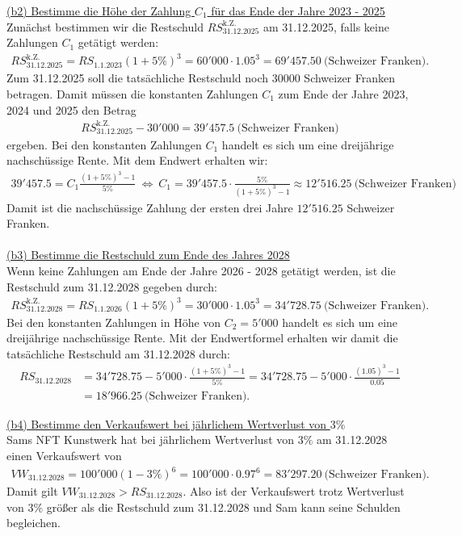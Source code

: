 \underline{(b2) Bestimme die Höhe der Zahlung $C_1$ für das Ende der Jahre 2023 - 2025}\\
Zunächst bestimmen wir die Restschuld $RS_{\mathrm{31.12.2025}}^{\mathrm{k.Z.}}$ am 31.12.2025, falls keine Zahlungen $C_1$ getätigt werden:
\begin{align*}
RS_{\mathrm{31.12.2025}}^{\mathrm{k.Z.}}
	=
	RS_{\mathrm{1.1.2023}}
	(1+ 5\% )^3
	=
	60'000 \cdot  1.05^3 
	=
	69'457.50 \ \textrm{(Schweizer Franken)}.
\end{align*}
Zum 31.12.2025 soll die tatsächliche Restschuld noch $30000$ Schweizer Franken betragen. Damit müssen die konstanten Zahlungen $C_1$ zum Ende der Jahre 2023, 2024 und 2025 den Betrag
\begin{align*}
	RS_{\mathrm{31.12.2025}}^{\mathrm{k.Z.}}
	- 30'000
	= 39'457.5\ \textrm{(Schweizer Franken)}
\end{align*}
ergeben. Bei den konstanten Zahlungen $C_1$ handelt es sich um eine dreijährige nachschüssige Rente. Mit dem Endwert erhalten wir:
\begin{align*}
	39'457.5
	= C_1 \frac{(1 + 5 \%)^3 -1 }{5 \%}
	\ \Leftrightarrow \
	C_1 = 39'457.5 \cdot \frac{5 \%}{(1 + 5 \%)^3 -1}
	\approx
	12'516.25 \ \textrm{(Schweizer Franken)}
\end{align*}
Damit ist die nachschüssige Zahlung der ersten drei Jahre 
$12'516.25$ Schweizer Franken.\\
\\
\underline{(b3) Bestimme die Restschuld zum Ende des Jahres 2028}\\
Wenn keine Zahlungen am Ende der Jahre 2026 - 2028 getätigt werden, ist die Restschuld zum 31.12.2028 gegeben durch:
\begin{align*}
	RS_{\mathrm{31.12.2028}}^{\mathrm{k.Z.}}
	=
	RS_{\mathrm{1.1.2026}} (1 + 5\%)^3
	=
	30'000 \cdot 1.05^3
	=
	34'728.75 \ \textrm{(Schweizer Franken)}.
\end{align*}
Bei den konstanten Zahlungen in Höhe von  $C_2 = 5'000$ handelt es sich um eine dreijährige nachschüssige Rente. Mit der Endwertformel erhalten wir damit die tatsächliche Restschuld am 31.12.2028 durch:
\begin{align*}
	RS_{\mathrm{31.12.2028}}
	&= 
	34'728.75 - 
	5'000 
	\cdot 
	\frac{(1+ 5 \%)^3 -1}{5 \%}
	=
	34'728.75 - 
	5'000 
	\cdot 
	\frac{(1.05)^3 -1}{0.05}\\
	&=
	18'966.25 \ \textrm{(Schweizer Franken)}.
\end{align*}


\underline{(b4) Bestimme den Verkaufswert bei jährlichem Wertverlust von $3 \%$}\\
Sams NFT Kunstwerk hat bei jährlichem Wertverlust von $3 \%$ am 31.12.2028 einen Verkaufswert von 
\begin{align*}
	VW_{\mathrm{31.12.2028}}
	=
	100'000 (1- 3 \%)^6
	=
	100'000 \cdot 0.97^6
	= 83'297.20 \ \textrm{(Schweizer Franken)}.
\end{align*}
Damit gilt $VW_{\mathrm{31.12.2028}} > RS_{\mathrm{31.12.2028}}$. Also ist der Verkaufswert trotz Wertverlust von $3 \%$ größer als die Restschuld zum 31.12.2028 und Sam kann seine Schulden begleichen.
\newpage
